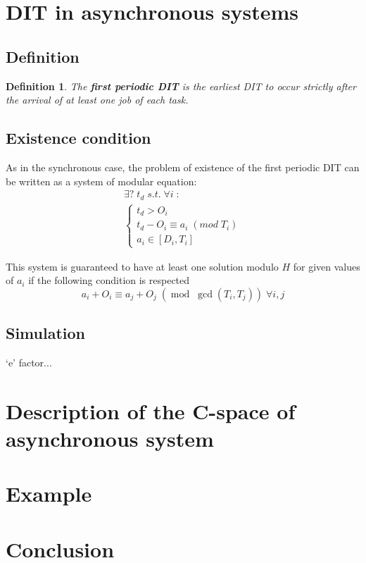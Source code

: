 \documentclass[times, 10pt,twocolumn, a4paper]{article}
\newtheorem{definition}{Definition}
\begin{document}
\section{DIT in asynchronous systems}
	\label{sct:asyncDIT}

	\subsection{Definition}

\begin{definition}
	The \textbf{first periodic DIT} is the earliest DIT to occur strictly after the
	arrival of at least one job of each task.
\end{definition}

\subsection{Existence condition}
	As in the synchronous case, the problem of existence of the first periodic DIT can be written as a system of modular equation:
	\[
		\begin{array}{l}
			\exists ? \; t_d \; s.t. \; \forall i \; :\\
			\left\{
				\begin{array}{l}
					t_d > O_i \\
					t_d - O_i \equiv a_i \; (mod \; T_i) \\
					a_i \in [D_i, T_i]
				\end{array}
			\right.
		\end{array}
	\]
	
	This system is guaranteed to have at least one solution modulo $H$ for given
	values of $a_i$ if the following condition is respected $$a_i + O_i \equiv a_j +
	O_j \; (\operatorname{mod} \; \operatorname{gcd}(T_i, T_j)) \; \forall i, j$$

  \subsection{Simulation}

  `e' factor...

\section{Description of the C-space of asynchronous system}
  \label{sct:asyncCspace}

\section{Example}

\section{Conclusion}



\end{document}
